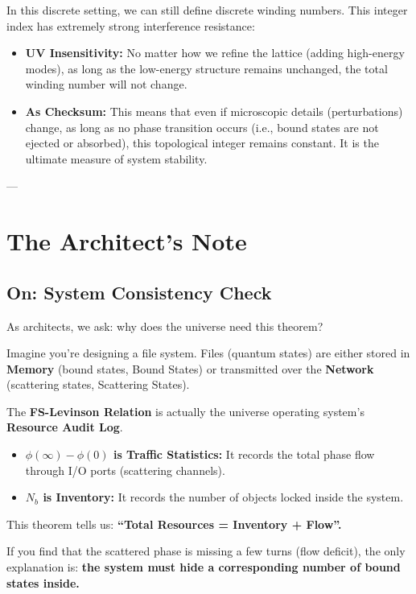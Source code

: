 In this discrete setting, we can still define discrete winding numbers. This integer index has extremely strong interference resistance:

\begin{itemize}
\item \textbf{UV Insensitivity:} No matter how we refine the lattice (adding high-energy modes), as long as the low-energy structure remains unchanged, the total winding number will not change.

\item \textbf{As Checksum:} This means that even if microscopic details (perturbations) change, as long as no phase transition occurs (i.e., bound states are not ejected or absorbed), this topological integer remains constant. It is the ultimate measure of system stability.
\end{itemize}

---

\section{The Architect's Note}

\subsection{On: System Consistency Check}

As architects, we ask: why does the universe need this theorem?

Imagine you're designing a file system. Files (quantum states) are either stored in \textbf{Memory} (bound states, Bound States) or transmitted over the \textbf{Network} (scattering states, Scattering States).

The \textbf{FS-Levinson Relation} is actually the universe operating system's \textbf{Resource Audit Log}.

\begin{itemize}
\item \textbf{$\phi(\infty) - \phi(0)$ is Traffic Statistics:} It records the total phase flow through I/O ports (scattering channels).

\item \textbf{$N_b$ is Inventory:} It records the number of objects locked inside the system.
\end{itemize}

This theorem tells us: \textbf{``Total Resources = Inventory + Flow''.}

If you find that the scattered phase is missing a few turns (flow deficit), the only explanation is: \textbf{the system must hide a corresponding number of bound states inside.}

